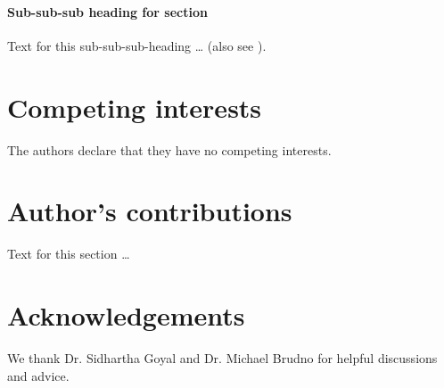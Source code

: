 \documentclass{bmcart}
\begin{document}
\paragraph*{Sub-sub-sub heading for section}
Text for this sub-sub-sub-heading \ldots
(also see \cite{koon,khar,zvai,xjon,marg}).


\begin{backmatter}

\section*{Competing interests}
  The authors declare that they have no competing interests.

\section*{Author's contributions}
    Text for this section \ldots

\section*{Acknowledgements}
We thank Dr. Sidhartha Goyal and Dr. Michael Brudno for helpful discussions and advice. 



\end{backmatter}
\end{document}
